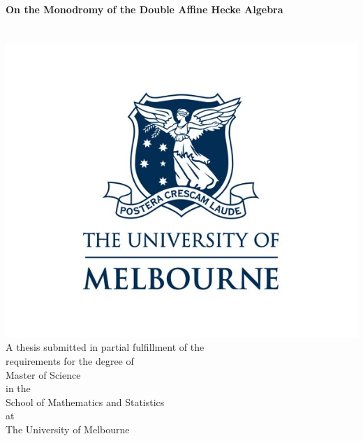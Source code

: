 \documentclass[a4paper]{report}
\author{
  Julianne Cai, 1413991\\
}
\title{}
\date{\today}
\theoremstyle{theorem}
\theoremstyle{definition}
\theoremstyle{remark}
\theoremstyle{proposition}
\theoremstyle{conjecture}
\theoremstyle{lemma}
\theoremstyle{corollary}
\theoremstyle{exercise}
\theoremstyle{example}
\begin{document}
\begin{titlepage}

  \begin{center}
      \vspace*{1cm}
      \huge
      \textbf{On the Monodromy of the Double Affine Hecke Algebra}\\
      \vspace{2cm}
      \Large
      \\
      \\
      \includegraphics[scale=0.5]{unimelb-logo.jpg}\\
      A thesis submitted in partial fulfillment of the\\
      requirements for the degree of\\
      Master of Science\\
      in the\\
      School of Mathematics and Statistics\\
      at\\
      The University of Melbourne\\
  \end{center}
  
  \end{titlepage}
  
\end{document}
